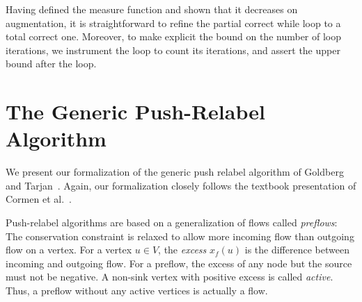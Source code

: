 \documentclass[smallcondensed]{svjour3}     %
\begin{document}
%   
%   
%   
  
  Having defined the measure function and shown that it decreases on augmentation, it is straightforward to refine the partial correct while loop to a total correct one. Moreover, to make explicit the bound on the number of loop iterations, we instrument the loop to count its iterations, and assert the upper bound after the loop.


\section{The Generic Push-Relabel Algorithm}\label{sec:gen-prpu}
  We present our formalization of the generic push relabel algorithm of Goldberg and Tarjan~\cite{GoTa88}. 
  Again, our formalization closely follows the textbook presentation of Cormen et al.~\cite{CLRS09}.
  
  Push-relabel algorithms are based on a generalization of flows called \emph{preflows}: 
  The conservation constraint is relaxed to allow more incoming flow than outgoing flow on a vertex.
  For a vertex $u\in V$, the \emph{excess} $x_f(u)$ is the difference between incoming and outgoing flow. 
  For a preflow, the excess of any node but the source must not be negative.
  A non-sink vertex with positive excess is called \emph{active}. Thus, a preflow without any active vertices is actually a flow.
  
\end{document}
